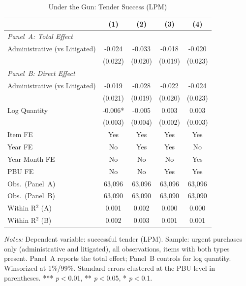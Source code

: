 \begin{table}[ht]
  \centering
  \caption{Under the Gun: Tender Success (LPM)}
  \label{tab:t1_utg_success}
  \small
  \begin{threeparttable}
  \begin{tabular}{lcccc}
    \hline\hline
    & (1) & (2) & (3) & (4) \\
    \hline
    \multicolumn{5}{l}{\textit{Panel~A: Total Effect}} \\[3pt]
    Administrative (vs Litigated) & -0.024 & -0.033 & -0.018 & -0.020 \\
     & (0.022) & (0.020) & (0.019) & (0.023) \\[3pt]
    \hline
    \multicolumn{5}{l}{\textit{Panel~B: Direct Effect}} \\[3pt]
    Administrative (vs Litigated) & -0.019 & -0.028 & -0.022 & -0.024 \\
     & (0.021) & (0.019) & (0.020) & (0.023) \\[3pt]
    Log Quantity & -0.006* & -0.005 & 0.003 & 0.003 \\
     & (0.003) & (0.004) & (0.002) & (0.003) \\[3pt]
    \hline
    Item FE & Yes & Yes & Yes & Yes \\
    Year FE & No & Yes & Yes & No \\
    Year-Month FE & No & No & No & Yes \\
    PBU FE & No & No & Yes & Yes \\
    Obs.\ (Panel~A) & 63,096 & 63,096 & 63,096 & 63,096 \\
    Obs.\ (Panel~B) & 63,090 & 63,090 & 63,090 & 63,090 \\
    Within R$^2$ (A) & 0.001 & 0.002 & 0.000 & 0.000 \\
    Within R$^2$ (B) & 0.002 & 0.003 & 0.001 & 0.001 \\
    \hline\hline
  \end{tabular}
  \begin{tablenotes}
    \small
    \item \textit{Notes:} Dependent variable: successful tender (LPM). Sample: urgent purchases only (administrative and litigated), all observations, items with both types present. Panel~A reports the total effect; Panel~B controls for log quantity. Winsorized at 1\%/99\%. Standard errors clustered at the PBU level in parentheses. *** \textit{p}$<$0.01, ** \textit{p}$<$0.05, * \textit{p}$<$0.1.
  \end{tablenotes}
  \end{threeparttable}
\end{table}
